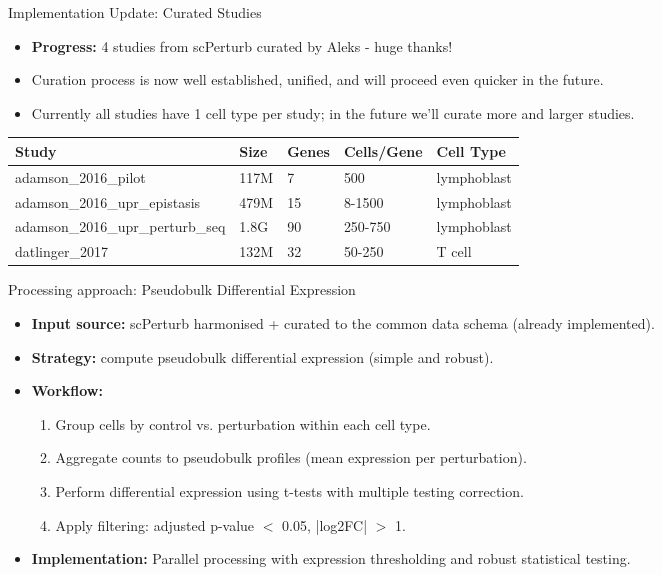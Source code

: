 \documentclass[handout]{beamer}
\begin{document}
\begin{frame}{Implementation Update: Curated Studies}
    \begin{itemize}
        \item \textbf{Progress:} 4 studies from scPerturb curated by Aleks - huge thanks!
        \item Curation process is now well established, unified, and will proceed even quicker in the future.
        \item Currently all studies have 1 cell type per study; in the future we'll curate more and larger studies.
    \end{itemize}
    
    \vspace{0.5em}
    \fontsize{8}{9}\selectfont
    \begin{tabular}{@{}p{4.0cm}p{1cm}p{1.0cm}p{1.5cm}p{1.5cm}@{}}
        \toprule
        \textbf{Study} & \textbf{Size} & \textbf{Genes} & \textbf{Cells/Gene} & \textbf{Cell Type} \\
        \midrule
        adamson\_2016\_pilot & 117M & 7 & 500 & lymphoblast \\
        adamson\_2016\_upr\_epistasis & 479M & 15 & 8-1500 & lymphoblast \\
        adamson\_2016\_upr\_perturb\_seq & 1.8G & 90 & 250-750 & lymphoblast \\
        datlinger\_2017 & 132M & 32 & 50-250 & T cell \\
        \bottomrule
    \end{tabular}
\end{frame}

\begin{frame}{Processing approach: Pseudobulk Differential Expression}
    \begin{itemize}
        \item \textbf{Input source:} scPerturb harmonised + curated to the common data schema (already implemented).
        \item \textbf{Strategy:} compute pseudobulk differential expression (simple and robust).
        \item \textbf{Workflow:}
        \begin{enumerate}
            \item Group cells by control vs. perturbation within each cell type.
            \item Aggregate counts to pseudobulk profiles (mean expression per perturbation).
            \item Perform differential expression using t-tests with multiple testing correction.
            \item Apply filtering: adjusted p-value $<$ 0.05, |log2FC| $>$ 1.
        \end{enumerate}
        \item \textbf{Implementation:} Parallel processing with expression thresholding and robust statistical testing.
    \end{itemize}
\end{frame}
\end{document}
